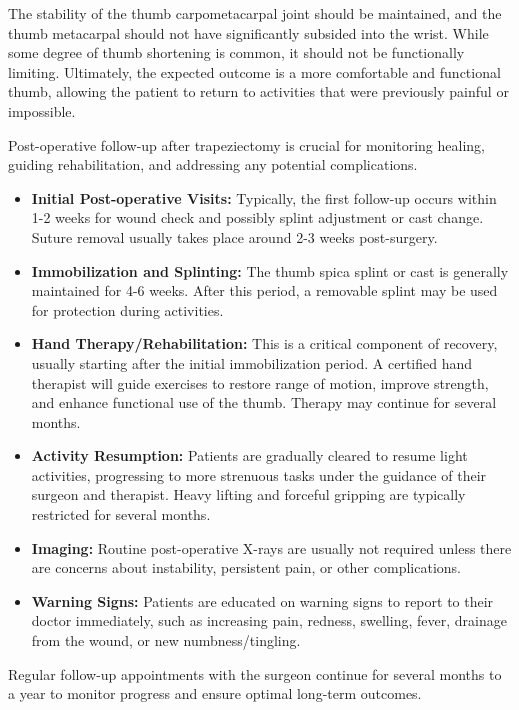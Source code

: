 The stability of the thumb carpometacarpal joint should be maintained, and the thumb metacarpal should not have significantly subsided into the wrist. While some degree of thumb shortening is common, it should not be functionally limiting. Ultimately, the expected outcome is a more comfortable and functional thumb, allowing the patient to return to activities that were previously painful or impossible.

Post-operative follow-up after trapeziectomy is crucial for monitoring healing, guiding rehabilitation, and addressing any potential complications.

\begin{itemize}
  \item \textbf{Initial Post-operative Visits:} Typically, the first follow-up occurs within 1-2 weeks for wound check and possibly splint adjustment or cast change. Suture removal usually takes place around 2-3 weeks post-surgery.
  \item \textbf{Immobilization and Splinting:} The thumb spica splint or cast is generally maintained for 4-6 weeks. After this period, a removable splint may be used for protection during activities.
  \item \textbf{Hand Therapy/Rehabilitation:} This is a critical component of recovery, usually starting after the initial immobilization period. A certified hand therapist will guide exercises to restore range of motion, improve strength, and enhance functional use of the thumb. Therapy may continue for several months.
  \item \textbf{Activity Resumption:} Patients are gradually cleared to resume light activities, progressing to more strenuous tasks under the guidance of their surgeon and therapist. Heavy lifting and forceful gripping are typically restricted for several months.
  \item \textbf{Imaging:} Routine post-operative X-rays are usually not required unless there are concerns about instability, persistent pain, or other complications.
  \item \textbf{Warning Signs:} Patients are educated on warning signs to report to their doctor immediately, such as increasing pain, redness, swelling, fever, drainage from the wound, or new numbness/tingling.
\end{itemize}

Regular follow-up appointments with the surgeon continue for several months to a year to monitor progress and ensure optimal long-term outcomes.

